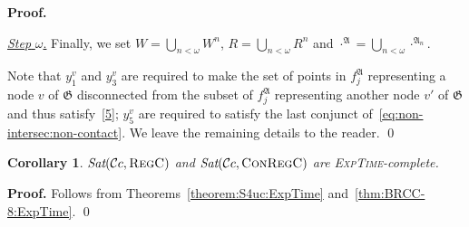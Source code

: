 \documentclass{LMCS}
\renewenvironment{proof}{\par\noindent\textbf{Proof.}}{\mbox{}\qed\par\medskip}
\theoremstyle{plain}
\newtheorem{corollary}[thm]{Corollary}
\newcommand{\cBC}{\ensuremath{\mathcal{C}}}
\newcommand{\cBCc}{\ensuremath{\cBC{}c}} \newcommand{\cBCcc}{\ensuremath{\cBC{}cc}}
\newcommand{\Sat}{\textit{Sat}}
\newcommand{\Regc}{\textsc{RegC}}
\newcommand{\ConR}{\textsc{ConRegC}}
\newcommand{\ExpTime}{\textsc{ExpTime}}
\begin{document}
\begin{proof}
\smallskip

\underline{\emph{Step} $\omega$.} Finally, we set $W=
\bigcup_{n<\omega} W^n$, $R= \bigcup_{n<\omega} R^n$ and $\cdot^\mathfrak{A} = \bigcup_{n < \omega}
\cdot^{\mathfrak{A}_n}$.

Note that $y^v_1$ and $y^v_3$ are required to make the set of points
in $f_j^\mathfrak{A}$ representing a node $v$ of $\mathfrak{G}$
disconnected from the subset of $f_j^\mathfrak{A}$ representing
another node $v'$ of $\mathfrak{G}$ and thus satisfy~\eqref{5};
$y^v_5$ are required to satisfy the last conjunct
of~\eqref{eq:non-intersec:non-contact}. We leave the remaining
details to the reader.
\end{proof}

\begin{corollary}
$\Sat( \cBCc, \Regc)$  and $\Sat( \cBCc, \ConR)$ are \ExpTime{}-complete.
\label{cor:BRCC-8:ExpTimecomplete}
\end{corollary}
\begin{proof}
Follows from Theorems~\ref{theorem:S4uc:ExpTime} and~\ref{thm:BRCC-8:ExpTime}.
\end{proof}
\end{document}

